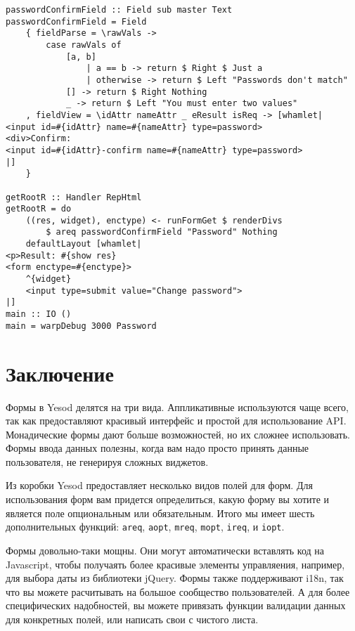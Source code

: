 \begin{lstlisting}
passwordConfirmField :: Field sub master Text
passwordConfirmField = Field
    { fieldParse = \rawVals ->
        case rawVals of
            [a, b]
                | a == b -> return $ Right $ Just a
                | otherwise -> return $ Left "Passwords don't match"
            [] -> return $ Right Nothing
            _ -> return $ Left "You must enter two values"
    , fieldView = \idAttr nameAttr _ eResult isReq -> [whamlet|
<input id=#{idAttr} name=#{nameAttr} type=password>
<div>Confirm:
<input id=#{idAttr}-confirm name=#{nameAttr} type=password>
|]
    }

getRootR :: Handler RepHtml
getRootR = do
    ((res, widget), enctype) <- runFormGet $ renderDivs
        $ areq passwordConfirmField "Password" Nothing
    defaultLayout [whamlet|
<p>Result: #{show res}
<form enctype=#{enctype}>
    ^{widget}
    <input type=submit value="Change password">
|]
main :: IO ()
main = warpDebug 3000 Password
\end{lstlisting}

\section{Заключение}

Формы в Yesod делятся на три вида. Аппликативные используются чаще всего, так как
предоставляют красивый интерфейс и простой для использование API. Монадические формы дают
больше возможностей, но их сложнее использовать. Формы ввода данных полезны, когда вам
надо просто принять данные пользователя, не генерируя сложных виджетов.

Из коробки Yesod предоставляет несколько видов полей для форм. Для использования
форм вам придется определиться, какую форму вы хотите и является поле опциональным или
обязательным. Итого мы имеет шесть дополнительных функций: \lstinline'areq', \lstinline'aopt', \lstinline'mreq', \lstinline'mopt', \lstinline'ireq',
и \lstinline'iopt'.

Формы довольно-таки мощны. Они могут автоматически вставлять код на Javascript, чтобы
получаять более красивые элементы управляения, например, для выбора даты из библиотеки 
jQuery. Формы также поддерживают  i18n, так что вы можете расчитывать на большое
сообщество пользователей. А для более специфических надобностей, вы можете привязать
функции валидации данных для конкретных полей, или написать свои с чистого  листа.


